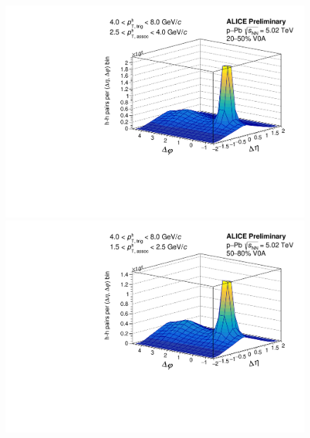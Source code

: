 \begin{figure}[ht]
\begin{minipage}{0.48\textwidth}
	\end{minipage}
	\begin{minipage}{0.48\textwidth}
		\includegraphics[width=\textwidth]{figures/analysis/h_h_2d_nomixcor_fancy_label_20_50_highpt.pdf}
	\end{minipage}
	\begin{minipage}{0.48\textwidth}
		\includegraphics[width=\textwidth]{figures/analysis/h_h_2d_nomixcor_fancy_label_50_80_lowpt.pdf}
	\end{minipage}
	\begin{minipage}{0.48\textwidth}

\end{minipage}
\end{figure}
